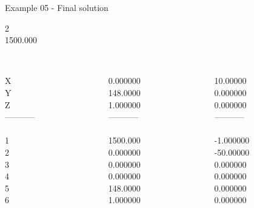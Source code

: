 \begin{frame}{Example 05 - Final solution}

  2\\
  1500.000\\

\begin{columns}[t]
\begin{column}{0.3\textwidth}
\\
X\\
Y\\
Z\\
-----------\\
\\
1\\
2\\
3\\
4\\
5\\
6\\

\end{column}
\begin{column}{0.3\textwidth}
\\
0.000000 \\
148.0000\\
1.000000\\

-----------\\
\\
1500.000\\
0.000000\\
0.000000\\
0.000000\\
148.0000\\
1.000000\\

\end{column}  

\begin{column}{0.3\textwidth}
\\
10.00000\\
0.000000\\
0.000000\\

-----------\\
\\
-1.000000\\
-50.00000\\
0.000000\\
0.000000\\
0.000000\\
0.000000\\
\end{column}
\end{columns}  
\end{frame}
